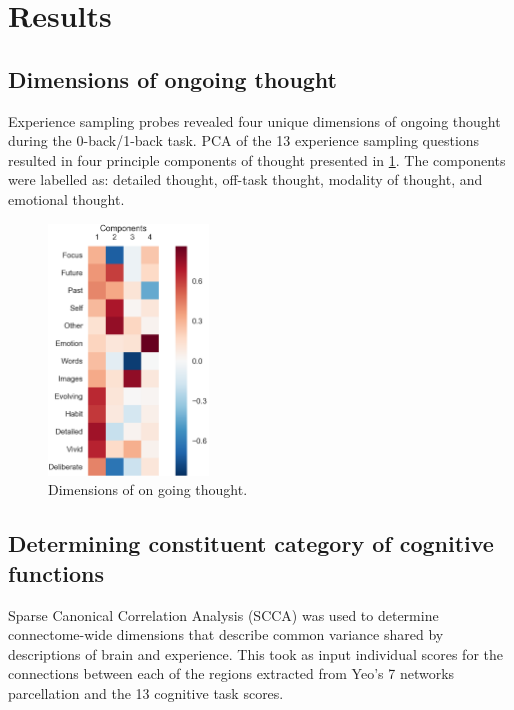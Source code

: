 \section{Results}
\label{study3:results}

\subsection{Dimensions of ongoing thought}
Experience sampling probes revealed four unique dimensions of ongoing thought during the 0-back/1-back task. PCA of the 13 experience sampling questions resulted in four principle components of thought presented in \cref{fig:study3:figPCA}. The components were labelled as: detailed thought, off-task thought, modality of thought, and emotional thought.

\begin{figure}
    \vspace{-10pt}
    \centering
    \includegraphics[width=0.38\textwidth]{study3/image/study3pca.png}
    \caption{Dimensions of on going thought.}
    \label{fig:study3:figPCA}
    \vspace{-20pt}
\end{figure}


\subsection{Determining constituent category of cognitive functions}

Sparse Canonical Correlation Analysis (SCCA) was used to determine connectome-wide dimensions that describe common variance shared by descriptions of brain and experience. This took as input individual scores for the connections between each of the regions extracted from Yeo's 7 networks parcellation and the 13 cognitive task scores.

